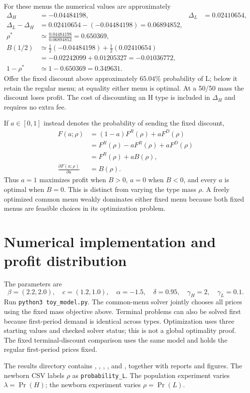 \documentclass[12pt]{article}
\theoremstyle{definition}
\theoremstyle{remark}
\numberwithin{equation}{section}
\begin{document}
For these menus the numerical values are approximately
\begin{align}
 \Delta_H&=-0.04484198,&\Delta_L&=0.02410654,\\
 \Delta_L-\Delta_H&=0.02410654-(-0.04484198)=0.06894852,\\
 \rho^*&\simeq\frac{0.04484198}{0.06894852}=0.650369,\\
 B(1/2)&\simeq\tfrac12(-0.04484198)+\tfrac12(0.02410654)\\
 &=-0.02242099+0.01205327=-0.01036772,\\
 1-\rho^*&\simeq1-0.650369=0.349631.
\end{align}
Offer the fixed discount above approximately $65.04\%$ probability of L;
below it retain the regular menu; at equality either menu is optimal.
At a 50/50 mass the discount loses profit. The cost of discounting an H type
is included in $\Delta_H$ and requires no extra fee.

If $a\in[0,1]$ instead denotes the probability of sending the fixed discount,
\begin{align}
 F(a;\rho)&=(1-a)F^R(\rho)+aF^D(\rho)\\
 &=F^R(\rho)-aF^R(\rho)+aF^D(\rho)\\
 &=F^R(\rho)+aB(\rho),\\
 \frac{\partial F(a;\rho)}{\partial a}&=B(\rho).
\end{align}
Thus $a=1$ maximizes profit when $B>0$, $a=0$ when $B<0$, and every $a$
is optimal when $B=0$. This is distinct from varying the type mass $\rho$.
A freely optimized common menu weakly dominates either fixed menu because
both fixed menus are feasible choices in its optimization problem.

\section{Numerical implementation and profit distribution}
The parameters are
\[
 \beta=(2.2,2.0),\quad c=(1.2,1.0),\quad\alpha=-1.5,\quad
 \delta=0.95,\quad\gamma_H=2,\quad\gamma_L=0.1.
\]
Run \texttt{python3 toy\_model.py}. The common-menu solver jointly
chooses all prices using the fixed mass objective above. Terminal problems
can also be solved first because first-period demand is identical across types.
Optimization uses three starting values and checked solver status; this is not
a global optimality proof. The fixed terminal-discount comparison uses the same
model and holds the regular first-period prices fixed.

The results directory contains ,
, ,
, and
, together
with reports and figures. The newborn CSV labels $\rho$ as
\texttt{probability\_L}. The population experiment varies $\lambda=\Pr(H)$;
the newborn experiment varies $\rho=\Pr(L)$.
\end{document}

